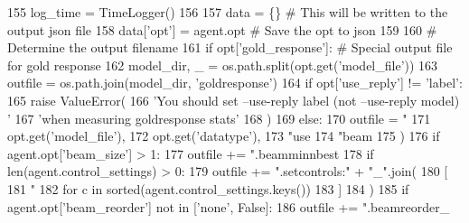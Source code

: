 \begin{DoxyCode}
155     log\_time = TimeLogger()
156 
157     data = \{\}  \textcolor{comment}{# This will be written to the output json file}
158     data[\textcolor{stringliteral}{'opt'}] = agent.opt  \textcolor{comment}{# Save the opt to json}
159 
160     \textcolor{comment}{# Determine the output filename}
161     \textcolor{keywordflow}{if} opt[\textcolor{stringliteral}{'gold\_response'}]:  \textcolor{comment}{# Special output file for gold response}
162         model\_dir, \_ = os.path.split(opt.get(\textcolor{stringliteral}{'model\_file'}))
163         outfile = os.path.join(model\_dir, \textcolor{stringliteral}{'goldresponse'})
164         \textcolor{keywordflow}{if} opt[\textcolor{stringliteral}{'use\_reply'}] != \textcolor{stringliteral}{'label'}:
165             \textcolor{keywordflow}{raise} ValueError(
166                 \textcolor{stringliteral}{'You should set --use-reply label (not --use-reply model) '}
167                 \textcolor{stringliteral}{'when measuring goldresponse stats'}
168             )
169     \textcolor{keywordflow}{else}:
170         outfile = \textcolor{stringliteral}{"%
171             opt.get(\textcolor{stringliteral}{'model\_file'}),
172             opt.get(\textcolor{stringliteral}{'datatype'}),
173             \textcolor{stringliteral}{"use%
174             \textcolor{stringliteral}{"beam%
175         )
176         \textcolor{keywordflow}{if} agent.opt[\textcolor{stringliteral}{'beam\_size'}] > 1:
177             outfile += \textcolor{stringliteral}{".beamminnbest%
178         \textcolor{keywordflow}{if} len(agent.control\_settings) > 0:
179             outfile += \textcolor{stringliteral}{".setcontrols:"} + \textcolor{stringliteral}{"\_"}.join(
180                 [
181                     \textcolor{stringliteral}{"%
182                     \textcolor{keywordflow}{for} c \textcolor{keywordflow}{in} sorted(agent.control\_settings.keys())
183                 ]
184             )
185         \textcolor{keywordflow}{if} agent.opt[\textcolor{stringliteral}{'beam\_reorder'}] \textcolor{keywordflow}{not} \textcolor{keywordflow}{in} [\textcolor{stringliteral}{'none'}, \textcolor{keyword}{False}]:
186             outfile += \textcolor{stringliteral}{".beamreorder\_%
}}}}}}
\end{DoxyCode}
